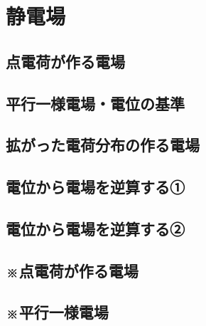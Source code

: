\documentclass[../../ps_a.tex]{subfiles}
\begin{document}
\section{静電場}

\subsection{点電荷が作る電場}
    

    \vspace{1cm}
    \vfill

\subsection{平行一様電場・電位の基準}
    

    \vspace{1cm}
    \vfill

\subsection{拡がった電荷分布の作る電場}
    

    \vspace{1cm}
    \vfill

\subsection{電位から電場を逆算する①}
    

    \vspace{1cm}
    \vfill

\subsection{電位から電場を逆算する②}
    

    \vspace{1cm}
    \vfill

\subsection{※点電荷が作る電場}
    

    \vspace{1cm}
    \vfill

\subsection{※平行一様電場}
    
\end{document}
